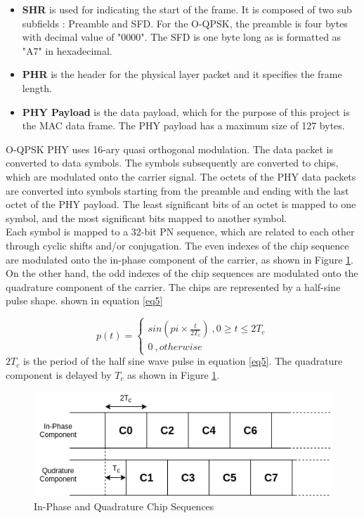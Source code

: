 \begin{itemize}
\item{ \textbf{\ac{SHR}} is used for indicating the start of the frame. 
It is composed of two sub subfields : Preamble and \ac{SFD}.
For the O-QPSK, the preamble is four bytes with decimal value of "0000".
The SFD is one byte long as is formatted as "A7" in hexadecimal.}
\item{ \textbf{PHR} is the header for the physical layer packet and it specifies the frame length.}
\item{ \textbf{PHY Payload} is the data payload, which for the purpose of this project is the MAC data frame.
The PHY payload has a maximum size of 127 bytes.}
\end{itemize}
 

O-QPSK PHY uses 16-ary quasi orthogonal modulation.
The data packet is converted to data symbols.
The symbols subsequently are converted to chips, which are modulated onto the carrier signal.
The octets of the PHY data packets are converted into symbols starting from the preamble and ending with the last octet of the PHY payload.
The least significant bits of an octet is mapped to one symbol, and the most significant bits mapped to another symbol.\\

Each symbol is mapped to a 32-bit \ac{PN} sequence, which are related to each other through cyclic shifts and/or conjugation.
The even indexes of the chip sequence are modulated onto the in-phase component of the carrier, as shown in Figure \ref{IQ_TC}.
On the other hand, the odd indexes of the chip sequences are modulated onto the quadrature component of the carrier.
The chips are represented by a half-sine pulse shape. shown in equation \ref{eq5}

\begin{equation}\label{eq5}
p(t) =
\begin{cases}
   sin( pi \times \frac{t}{2T_c})  \ ,0 \geq t \leq 2T_c \\
   0    \ ,otherwise
  \end{cases}
\end{equation}
$2T_c$ is the period of the half sine wave pulse in equation \ref{eq5}.
The quadrature component is delayed by $T_c$ as shown in Figure \ref{IQ_TC}.

\begin{figure}[h!]
\centering
\includegraphics[scale=0.6]{Figure/IQ_TC.png}
\caption{In-Phase and Quadrature Chip Sequences}
\label{IQ_TC}
\end{figure}

